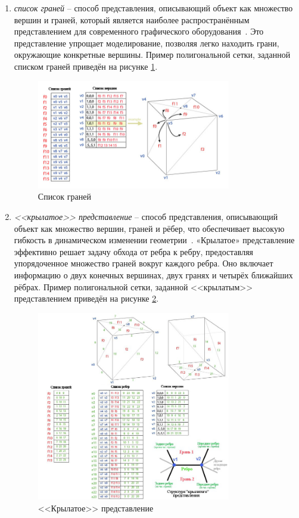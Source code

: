 \begin{enumerate}
	\item \textit{список граней} -- способ представления, описывающий объект как множество вершин и граней, который является наиболее распространённым представлением для современного графического оборудования~\cite{lit2}. Это представление упрощает моделирование, позволяя легко находить грани, окружающие конкретные вершины. Пример полигональной сетки, заданной списком граней приведён на рисунке \ref{fig:planes-list}. 
	\begin{figure}[h] 
		\centering
		\includegraphics[width=0.8\textwidth]{images/planes-list.png}
		\caption{Список граней} 
		\label{fig:planes-list} 
	\end{figure}
	
	\item \textit{<<крылатое>> представление} -- способ представления, описывающий объект как множество вершин, граней и рёбер, что обеспечивает высокую гибкость в динамическом изменении геометрии~\cite{lit2}. «Крылатое» представление эффективно решает задачу обхода от ребра к ребру, предоставляя упорядоченное множество граней вокруг каждого ребра. Оно включает информацию о двух конечных вершинах, двух гранях и четырёх ближайших рёбрах. Пример полигональной сетки, заданной <<крылатым>> представлением приведён на рисунке \ref{fig:wings-list}. 
	\begin{figure}[h] 
		\centering
		\includegraphics[width=0.8\textwidth]{images/wings-list.png}
		\caption{<<Крылатое>> представление} 
		\label{fig:wings-list} 
	\end{figure}
\end{enumerate}

